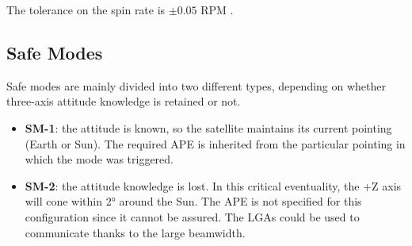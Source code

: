 The tolerance on the spin rate is $\pm 0.05$ RPM \cite{shadan}.

\subsection{Safe Modes}
\label{subsec:safe_modes}

Safe modes are mainly divided into two different types, depending on whether three-axis attitude knowledge is retained or not.
\begin{itemize}
    \item \textbf{SM-1}: the attitude is known, so the satellite maintains its current pointing (Earth or Sun). The required APE is inherited from the particular pointing in which the mode was triggered.
    \item \textbf{SM-2}: the attitude knowledge is lost. In this critical eventuality, the +Z axis will cone within 2° around the Sun. The APE is not specified for this configuration since it cannot be assured. The LGAs could be used to communicate thanks to the large beamwidth.
    \cite{juno_telecommunication}
\end{itemize}


